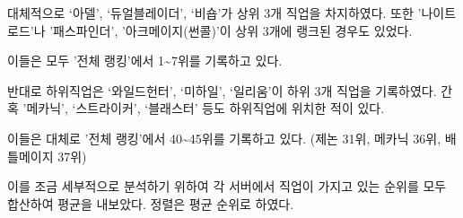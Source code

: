\documentclass[
]{article}
\begin{document}
대체적으로 `아델', `듀얼블레이더', `비숍'가 상위 3개 직업을 차지하였다.
또한 '나이트로드'나 '패스파인더', '아크메이지(썬콜)'이 상위 3개에 랭크된
경우도 있었다.

이들은 모두 '전체 랭킹'에서 1\textasciitilde7위를 기록하고 있다.

반대로 하위직업은 `와일드헌터', `미하일', `일리움'이 하위 3개 직업을
기록하였다. 간혹 '메카닉', `스트라이커', `블래스터' 등도 하위직업에
위치한 적이 있다.

이들은 대체로 '전체 랭킹'에서 40\textasciitilde45위를 기록하고 있다.
(제논 31위, 메카닉 36위, 배틀메이지 37위)

이를 조금 세부적으로 분석하기 위하여 각 서버에서 직업이 가지고 있는
순위를 모두 합산하여 평균을 내보았다. 정렬은 평균 순위로 하였다.

\begin{table}[H]
\centering
{}
\end{table}
\end{document}

